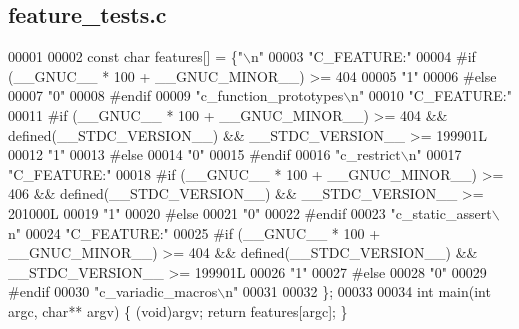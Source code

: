 \subsection{feature\+\_\+tests.\+c}
\label{soapysdr_2build_2CMakeFiles_2feature__tests_8c_source}

\begin{DoxyCode}
00001 
00002   \textcolor{keyword}{const} \textcolor{keywordtype}{char} features[] = \{\textcolor{stringliteral}{"\(\backslash\)n"}
00003 \textcolor{stringliteral}{"C\_FEATURE:"}
00004 \textcolor{preprocessor}{#if (\_\_GNUC\_\_ * 100 + \_\_GNUC\_MINOR\_\_) >= 404}
00005 \textcolor{stringliteral}{"1"}
00006 \textcolor{preprocessor}{#else}
00007 \textcolor{stringliteral}{"0"}
00008 \textcolor{preprocessor}{#endif}
00009 \textcolor{stringliteral}{"c\_function\_prototypes\(\backslash\)n"}
00010 \textcolor{stringliteral}{"C\_FEATURE:"}
00011 \textcolor{preprocessor}{#if (\_\_GNUC\_\_ * 100 + \_\_GNUC\_MINOR\_\_) >= 404 && defined(\_\_STDC\_VERSION\_\_) && \_\_STDC\_VERSION\_\_ >= 199901L}
00012 \textcolor{stringliteral}{"1"}
00013 \textcolor{preprocessor}{#else}
00014 \textcolor{stringliteral}{"0"}
00015 \textcolor{preprocessor}{#endif}
00016 \textcolor{stringliteral}{"c\_restrict\(\backslash\)n"}
00017 \textcolor{stringliteral}{"C\_FEATURE:"}
00018 \textcolor{preprocessor}{#if (\_\_GNUC\_\_ * 100 + \_\_GNUC\_MINOR\_\_) >= 406 && defined(\_\_STDC\_VERSION\_\_) && \_\_STDC\_VERSION\_\_ >= 201000L}
00019 \textcolor{stringliteral}{"1"}
00020 \textcolor{preprocessor}{#else}
00021 \textcolor{stringliteral}{"0"}
00022 \textcolor{preprocessor}{#endif}
00023 \textcolor{stringliteral}{"c\_static\_assert\(\backslash\)n"}
00024 \textcolor{stringliteral}{"C\_FEATURE:"}
00025 \textcolor{preprocessor}{#if (\_\_GNUC\_\_ * 100 + \_\_GNUC\_MINOR\_\_) >= 404 && defined(\_\_STDC\_VERSION\_\_) && \_\_STDC\_VERSION\_\_ >= 199901L}
00026 \textcolor{stringliteral}{"1"}
00027 \textcolor{preprocessor}{#else}
00028 \textcolor{stringliteral}{"0"}
00029 \textcolor{preprocessor}{#endif}
00030 \textcolor{stringliteral}{"c\_variadic\_macros\(\backslash\)n"}
00031 
00032 \};
00033 
00034 \textcolor{keywordtype}{int} main(\textcolor{keywordtype}{int} argc, \textcolor{keywordtype}{char}** argv) \{ (void)argv; \textcolor{keywordflow}{return} features[argc]; \}
\end{DoxyCode}
